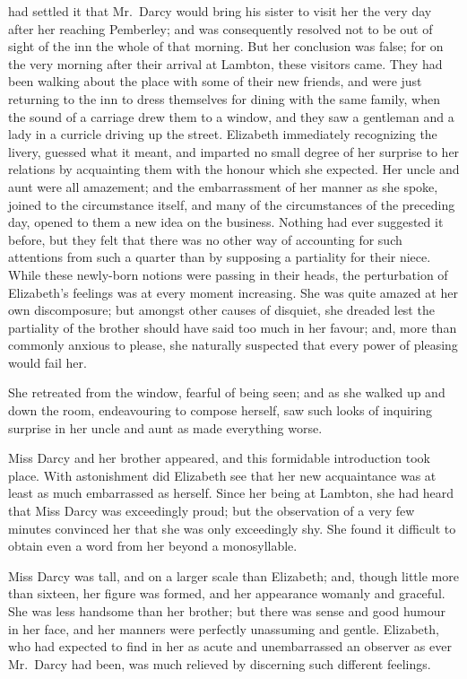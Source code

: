  had settled it that Mr.\ Darcy would bring his sister
to visit her the very day after her reaching Pemberley; and was
consequently resolved not to be out of sight of the inn the whole
of that morning.  But her conclusion was false; for on the very
morning after their arrival at Lambton, these visitors came.
They had been walking about the place with some of their new
friends, and were just returning to the inn to dress themselves
for dining with the same family, when the sound of a carriage
drew them to a window, and they saw a gentleman and a lady
in a curricle driving up the street.  Elizabeth immediately
recognizing the livery, guessed what it meant, and imparted no
small degree of her surprise to her relations by acquainting
them with the honour which she expected.  Her uncle and aunt
were all amazement; and the embarrassment of her manner as
she spoke, joined to the circumstance itself, and many of the
circumstances of the preceding day, opened to them a new idea
on the business.  Nothing had ever suggested it before, but they
felt that there was no other way of accounting for such attentions
from such a quarter than by supposing a partiality for their
niece.  While these newly-born notions were passing in their heads,
the perturbation of Elizabeth's feelings was at every moment
increasing.  She was quite amazed at her own discomposure; but
amongst other causes of disquiet, she dreaded lest the partiality
of the brother should have said too much in her favour; and, more
than commonly anxious to please, she naturally suspected that
every power of pleasing would fail her.

She retreated from the window, fearful of being seen; and as
she walked up and down the room, endeavouring to compose
herself, saw such looks of inquiring surprise in her uncle and
aunt as made everything worse.

Miss Darcy and her brother appeared, and this formidable
introduction took place.  With astonishment did Elizabeth see
that her new acquaintance was at least as much embarrassed as
herself.  Since her being at Lambton, she had heard that Miss
Darcy was exceedingly proud; but the observation of a very few
minutes convinced her that she was only exceedingly shy.  She
found it difficult to obtain even a word from her beyond a
monosyllable.

Miss Darcy was tall, and on a larger scale than Elizabeth;
and, though little more than sixteen, her figure was formed,
and her appearance womanly and graceful.  She was less handsome
than her brother; but there was sense and good humour in her
face, and her manners were perfectly unassuming and gentle.
Elizabeth, who had expected to find in her as acute and
unembarrassed an observer as ever Mr.\ Darcy had been, was
much relieved by discerning such different feelings.

